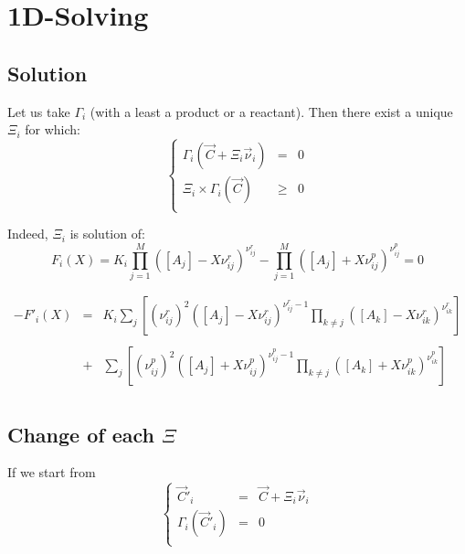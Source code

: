 \documentclass[aps,12pt]{revtex4}
\begin{document}
\section{1D-Solving}

\subsection{Solution}

Let us take $\Gamma_i$ (with a least a product or a reactant).
Then there exist a unique $\Xi_i$ for which:
\begin{equation}
\left\lbrace
\begin{array}{rcl}
	\Gamma_i(\vec{C} + \Xi_i \vec{\nu}_i ) & = & 0\\
	 \Xi_i \times \Gamma_i(\vec{C}) &\geq  &0\\
\end{array}
\right.
\end{equation}
 
Indeed, $\Xi_i$ is solution of:
\begin{equation}
	 F_i(X) =  K_i \prod_{j=1}^{M} \left([A_j] - X \nu^r_{ij}\right)^{\nu^r_{ij}} 
	- \prod_{j=1}^{M} \left([A_j] + X \nu^p_{ij} \right)^{\nu^p_{ij}} = 0
\end{equation} 

\begin{equation}
\begin{array}{rcr}
	- F'_i(X) & = & 
	\displaystyle
	K_i \sum_j 
	\left[
	\left(\nu_{ij}^r\right)^2 \left([A_j] - X \nu^r_{ij}\right)^{\nu^r_{ij}-1} 
	\prod_{k\not=j} \left([A_k] - X \nu^r_{ik}\right)^{\nu^r_{ik}} 
 	\right]\\
	\\
	& + &
	\displaystyle
	\sum_j \left[
	\left(\nu_{ij}^p\right)^2 \left([A_j] + X \nu^p_{ij}\right)^{\nu^p_{ij}-1} 
	\prod_{k\not=j} \left([A_k] + X \nu^p_{ik}\right)^{\nu^p_{ik}} 
 	\right]\\
\end{array}
\end{equation}


\subsection{Change of each $\Xi$}
If we start from
\begin{equation}
\left\lbrace
\begin{array}{rcl}
	\vec{C}'_i & = & \vec{C} + \Xi_i \vec{\nu}_i\\
	\Gamma_i(\vec{C}'_i) & = & 0\\
\end{array}
\right.
\end{equation}
\end{document}
